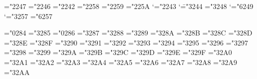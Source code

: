 
\let\mit=\undefined
\let\oldstyle=\undefined
\ifx\amstexloaded@\relax
 \let\oldnos=\undefined
\fi


\mathchardef\triangleleft="2247
\mathchardef\triangleright="2246
\def\vec{\mathaccent"0245 }
\ifx\amstexloaded@\relax
 \def\t#1#2{{\edef\next@{\the\font}\textfontii\accent"41 \next@#1#2}}
\else
 \def\t#1{{\edef\next{\the\font}\the\textfont2\accent"41\next#1}}
\fi
\mathchardef\comp="2242
\mathchardef\setdif="2258
\mathchardef\cupprod="2259
\mathchardef\capprod="225A
\mathcode`\+="2243
\mathcode`\=="3244
\mathchardef\Relbar="3248
\mathcode`\;="6249
\mathcode`\:="3257
\mathchardef\colon="6257


\mathchardef\hbar="0284
\mathchardef\notin="3285
\mathchardef\angle="0286
\mathchardef\doteq="3287
\mathchardef\models="3288
\mathchardef\bowtie="3289
\mathchardef\cong="328A
\mathchardef\hookleftarrow="328B
\mathchardef\hookrightarrow="328C
\mathchardef\longleftarrow="328D
\mathchardef\longrightarrow="328E
\mathchardef\Longleftarrow="328F
\mathchardef\Longrightarrow="3290
\mathchardef\mapsto="3291
\mathchardef\longmapsto="3292
\mathchardef\longleftrightarrow="3293
\mathchardef\Longleftrightarrow="3294
\mathchardef\rightleftharpoons="3295
\mathchardef\notless="3296
\let\nless=\notless
\mathchardef\notleq="3297
\let\nleq=\notleq
\mathchardef\notprec="3298
\let\nprec=\notprec
\mathchardef\notpreceq="3299
\let\npreceq=\notpreceq
\mathchardef\notsubset="329A
\let\nsubset=\notsubset
\mathchardef\notsubseteq="329B
\let\nsubseteq=\notsubseteq
\mathchardef\notsqsubseteq="329C
\let\nsqsubseteq=\notsqsubseteq
\mathchardef\notgr="329D
\let\ngtr=\notgr
\mathchardef\notgeq="329E
\let\ngeq=\notgeq
\mathchardef\notsucc="329F
\let\nsucc=\notsucc
\mathchardef\notsucceq="32A0
\let\nsucceq=\notsucceq
\mathchardef\notsupset="32A1
\let\nsupset=\notsupset
\mathchardef\notsupseteq="32A2
\let\nsupseteq=\notsupseteq
\mathchardef\notsqsupseteq="32A3
\let\nsqsupseteq=\notsqsupseteq
\mathchardef\neq="32A4 \let\ne=\neq
\mathchardef\notequiv="32A5
\mathchardef\notsim="32A6
\mathchardef\notsimeq="32A7
\mathchardef\notapprox="32A8
\mathchardef\notcong="32A9
\mathchardef\notasymp="32AA

